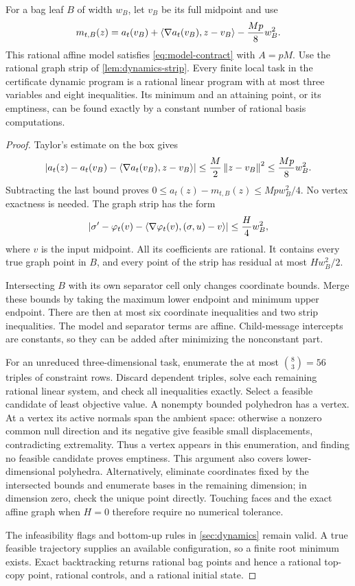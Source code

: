 \begin{lemma}
\label{lem:bit-local-lp}
For a bag leaf $B$ of width $w_B$, let $v_B$ be its full midpoint and use
\begin{equation}
 m_{t,B}(z)=a_t(v_B)+\left\langle \nabla a_t(v_B),z-v_B\right\rangle
                         -\frac{Mp}{8}w_B^2.
 \label{eq:bit-affine-model}
\end{equation}
This rational affine model satisfies \cref{eq:model-contract} with
$A=pM$.  Use the rational graph strip of \cref{lem:dynamics-strip}.
Every finite local task in the certificate dynamic program is a rational
linear program with at most three variables and eight inequalities.  Its
minimum and an attaining point, or its emptiness, can be found exactly by
a constant number of rational basis computations.
\end{lemma}

\begin{proof}
Taylor's estimate on the box gives
\[
 \left\lvert a_t(z)-a_t(v_B)-\left\langle \nabla a_t(v_B),z-v_B\right\rangle\right\rvert
 \le\frac M2\left\lVert z-v_B\right\rVert^2\le\frac{Mp}{8}w_B^2.
\]
Subtracting the last bound proves
$0\le a_t(z)-m_{t,B}(z)\le Mp w_B^2/4$.  No vertex exactness is needed.
The graph strip has the form
\[
 \left\lvert \sigma'-\varphi_t(v)
      -\left\langle \nabla\varphi_t(v),(\sigma,u)-v\right\rangle\right\rvert
 \le \frac H4w_B^2,
\]
where $v$ is the input midpoint.  All its coefficients are rational.
It contains every true graph point in $B$, and every point of the strip
has residual at most $Hw_B^2/2$.

Intersecting $B$ with its own separator cell only changes coordinate
bounds.  Merge these bounds by taking the maximum lower endpoint and
minimum upper endpoint.  There are then at most six coordinate
inequalities and two strip inequalities.  The model and separator terms
are affine.  Child-message intercepts are constants, so they can be
added after minimizing the nonconstant part.

For an unreduced three-dimensional task, enumerate the at most
$\binom83=56$ triples of constraint rows.  Discard dependent triples,
solve each remaining rational linear system, and check all inequalities
exactly.  Select a feasible candidate of least objective value.  A
nonempty bounded polyhedron has a vertex.  At a vertex its active normals
span the ambient space: otherwise a nonzero common null direction and
its negative give feasible small displacements, contradicting
extremality.  Thus a vertex appears in this enumeration, and finding no
feasible candidate proves emptiness.  This argument also covers
lower-dimensional polyhedra.  Alternatively, eliminate coordinates fixed
by the intersected bounds and enumerate bases in the remaining dimension;
in dimension zero, check the unique point directly.  Touching faces and
the exact affine graph when $H=0$ therefore require no numerical tolerance.

The infeasibility flags and bottom-up rules in \cref{sec:dynamics} remain
valid.  A true feasible trajectory supplies an available configuration,
so a finite root minimum exists.  Exact backtracking returns rational
bag points and hence a rational top-copy point, rational controls, and a
rational initial state.
\end{proof}

